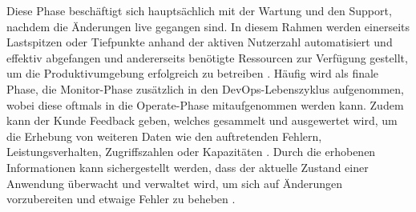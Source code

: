 Diese Phase beschäftigt sich hauptsächlich mit der Wartung und den Support, nachdem die Änderungen live gegangen sind. In diesem Rahmen werden einerseits Lastspitzen oder Tiefpunkte anhand der aktiven Nutzerzahl automatisiert und effektiv abgefangen und andererseits benötigte Ressourcen zur Verfügung gestellt, um die Produktivumgebung erfolgreich zu betreiben \cite{thedev_eight_2019}. Häufig wird als finale Phase, die Monitor-Phase zusätzlich in den DevOps-Lebenszyklus aufgenommen, wobei diese oftmals in die Operate-Phase mitaufgenommen werden kann. Zudem kann der Kunde Feedback geben, welches gesammelt und ausgewertet wird, um die Erhebung von weiteren Daten wie den auftretenden Fehlern, Leistungsverhalten, Zugriffszahlen oder Kapazitäten \cite{thedev_eight_2019}. Durch die erhobenen Informationen kann sichergestellt werden, dass der aktuelle Zustand einer Anwendung überwacht und verwaltet wird, um sich auf Änderungen vorzubereiten und etwaige Fehler zu beheben \cite[S. 127]{sturm_devops_2017}.

















 












